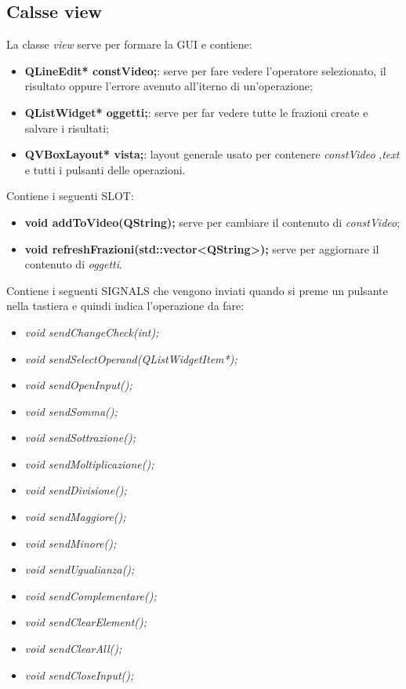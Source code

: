 \documentclass[a4paper,10pt]{article}
\begin{document}
    \subsection{Calsse view}
        La classe \textit{view} serve per formare la GUI e contiene:
        \begin{itemize}
            \item \textbf{QLineEdit* constVideo;}: serve per fare vedere l'operatore selezionato, il risultato oppure l'errore avenuto all'iterno di un'operazione;
            \item \textbf{QListWidget* oggetti;}: serve per far vedere tutte le frazioni create e salvare i risultati;
            \item \textbf{QVBoxLayout* vista;}: layout generale usato per contenere \textit{constVideo} ,\textit{text} e tutti i pulsanti delle operazioni.
        \end{itemize}
        Contiene i seguenti SLOT:
        \begin{itemize}
            \item \textbf{void addToVideo(QString);} serve per cambiare il contenuto di \textit{constVideo};
            \item \textbf{void refreshFrazioni(std::vector<QString>);} serve per aggiornare il contenuto di \textit{oggetti}.
        \end{itemize}
        Contiene i seguenti SIGNALS che vengono inviati quando si preme un pulsante nella tastiera e quindi indica l'operazione da fare:
        \begin{itemize}
            \item \textit{void sendChangeCheck(int);}
            \item \textit{void sendSelectOperand(QListWidgetItem*);}
            \item \textit{void sendOpenInput();}
            \item \textit{void sendSomma();}
            \item \textit{void sendSottrazione();}
            \item \textit{void sendMoltiplicazione();}
            \item \textit{void sendDivisione();}
            \item \textit{void sendMaggiore();}
            \item \textit{void sendMinore();}
            \item \textit{void sendUgualianza();}
            \item \textit{void sendComplementare();}
            \item \textit{void sendClearElement();}
            \item \textit{void sendClearAll();}
            \item \textit{void sendCloseInput();}
        \end{itemize}
\newpage
\end{document}
